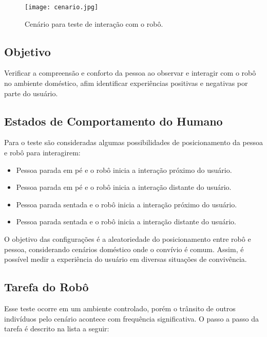 \begin{figure}[ht!]
	\centering
	\begin{minipage}{\textwidth}
		\caption{Cenário para teste de interação com o robô.}
		\texttt{[image: cenario.jpg]}
		\label{fig:cenario}
	\end{minipage}
\end{figure}

\subsection{Objetivo}

Verificar a compreensão e conforto da pessoa ao observar e interagir com o robô no ambiente doméstico, afim identificar experiências positivas e negativas por parte do usuário.

\subsection{Estados de Comportamento do Humano}

Para o teste são consideradas algumas possibilidades de posicionamento da pessoa e robô para interagirem:

\begin{itemize}
	\item Pessoa parada em pé e o robô inicia a interação próximo do usuário.
	\item Pessoa parada em pé e o robô inicia a interação distante do usuário.
	\item Pessoa parada sentada e o robô inicia a interação próximo do usuário.
	\item Pessoa parada sentada e o robô inicia a interação distante do usuário.
\end{itemize}

O objetivo das configurações é a aleatoriedade do posicionamento entre robô e pessoa, considerando cenários doméstico onde o convívio é comum. Assim, é possível medir a experiência do usuário em diversas situações de convivência.

\subsection{Tarefa do Robô}

Esse teste ocorre em um ambiente controlado, porém o trânsito de outros indivíduos pelo cenário acontece com frequência significativa. O passo a passo da tarefa é descrito na lista a seguir:

